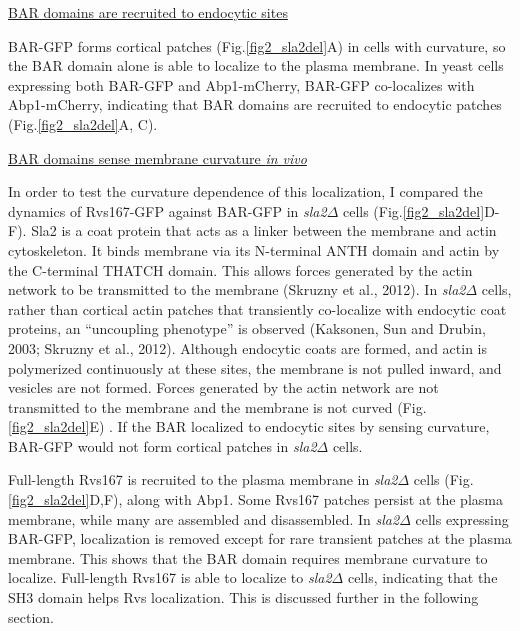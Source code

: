 	\vspace{5mm}
	\underline{BAR domains are recruited to endocytic sites}
	
BAR-GFP forms cortical patches (Fig.\ref{fig2_sla2del}A) in cells with curvature, so the BAR domain alone is able to localize to the plasma membrane. In yeast cells expressing both BAR-GFP and Abp1-mCherry, BAR-GFP co-localizes with Abp1-mCherry, indicating that BAR domains are recruited to endocytic patches  (Fig.\ref{fig2_sla2del}A, C).  



	\vspace{5mm}
	\underline{BAR domains sense membrane curvature \textit{in vivo}}
	
In order to test the curvature dependence of this localization, I compared the dynamics of Rvs167-GFP against BAR-GFP in \textit{sla2$\Delta$} cells (Fig.\ref{fig2_sla2del}D-F). Sla2 is a coat protein that acts as a linker between the membrane and actin cytoskeleton. It binds membrane via its N-terminal ANTH domain and actin by the C-terminal THATCH domain. This allows forces generated by the actin network to be transmitted to the membrane (Skruzny et al., 2012). In \textit{sla2$\Delta$} cells, rather than cortical actin patches that transiently co-localize with endocytic coat proteins, an “uncoupling phenotype” is observed (Kaksonen, Sun and Drubin, 2003; Skruzny et al., 2012). Although endocytic coats are formed, and actin is polymerized continuously at these sites, the membrane is not pulled inward, and vesicles are not formed. Forces generated by the actin network are not transmitted to the membrane and the membrane is not curved (Fig.\ref{fig2_sla2del}E) . If the BAR localized to endocytic sites by sensing curvature, BAR-GFP would not form cortical patches in \textit{sla2$\Delta$} cells.

Full-length Rvs167 is recruited to the plasma membrane in \textit{sla2$\Delta$} cells  (Fig.\ref{fig2_sla2del}D,F), along with Abp1. Some Rvs167 patches persist at the plasma membrane, while many are assembled and disassembled. In \textit{sla2$\Delta$} cells expressing BAR-GFP, localization is removed except for rare transient patches at the plasma membrane. This shows that the BAR domain requires membrane curvature to localize. Full-length Rvs167 is able to localize to \textit{sla2$\Delta$} cells, indicating that the SH3 domain helps Rvs localization. This is discussed further in the following section. 





